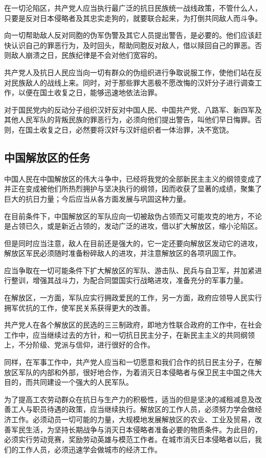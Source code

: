 在一切沦陷区，共产党人应当执行最广泛的抗日民族统一战线政策，不管什么人，只要是反对日本侵略者及其忠实走狗的，就要联合起来，为打倒共同敌人而斗争。

向一切帮助敌人反对同胞的伪军伪警及其它人员提出警告，是必要的。他们应该赶快认识自己的罪恶行为，及时回头，帮助同胞反对敌人，借以赎回自己的罪恶。否则敌人崩溃之日，民族纪律是不会对他们宽容的。

共产党人及抗日人民应当向一切有群众的伪组织进行争取说服工作，使他们站在反对民族敌人的战线上来。同时，对于那些罪大恶极不愿改悔的汉奸分子进行调查工作，以便在国土收复之日，能够迅速地依法治罪。

对于国民党内的反动分子组织汉奸反对中国人民、中国共产党、八路军、新四军及其他人民军队的背叛民族的罪恶行为，必须向他们提出警告，叫他们早日悔罪。否则，在国土收复之日，必然要将汉奸与汉奸组织者一体治罪，决不宽饶。

\subsection{中国解放区的任务}

中国人民在中国解放区的伟大斗争中，已经将我党的全部新民主主义的纲领变成了并正在变成被他们所热烈拥护与坚决执行的纲领，因而收获了显著的成绩，聚集了巨大的抗日力量；今后应当从各方面发展与巩固这种力量。

在目前条件下，中国解放区的军队应向一切被敌伪占领而又可能攻克的地方，不论是占领已久，或是新近占领的，发动广泛的进攻，借以扩大解放区，缩小沦陷区。

但是同时应当注意，敌人在目前还是强大的，它一定还要向解放区发动它的进攻，解放区军民必须随时准备粉碎敌人的进攻，并注意解放区的各项巩固工作。

应当争取在一切可能条件下扩大解放区的军队、游击队、民兵与自卫军，并加紧进行整训，增强其战斗力，为配合同盟国实行战略进攻，准备充分的军事力量。

在解放区，一方面，军队应实行拥政爱民的工作，另一方面，政府应领导人民实行拥军优抗的工作，使军民关系获得更大的改善。

共产党人在各个解放区的民选的三三制政府，即地方性联合政府的工作中，在社会工作中，应当继续过去的方针，和一切抗日民主分子，在新民主主义的共同纲领上，不分阶级、党派与信仰，进行很好的合作。

同样，在军事工作中，共产党人应当和一切愿意和我们合作的抗日民主分子，在解放区军队的内部和外部，很好地合作，为着消灭日本侵略者与保卫民主中国之伟大目的，而共同建设一个强大的人民军队。

为了提高工农劳动群众在抗日与生产力的积极性，适当的但是坚决的减租减息及改善工人与职员待遇的政策，应当继续执行。解放区的工作人员，必须努力学会做经济工作。必须动员一切可能的力量，大规模地发展解放区的农业、工业及贸易，改善军民生活，为坚持长期战争与消灭日本侵略者准备必要的物质条件。为此目的，必须实行劳动竞赛，奖励劳动英雄与模范工作者。在城市消灭日本侵略者以后，我们的工作人员，必须迅速学会做城市的经济工作。

